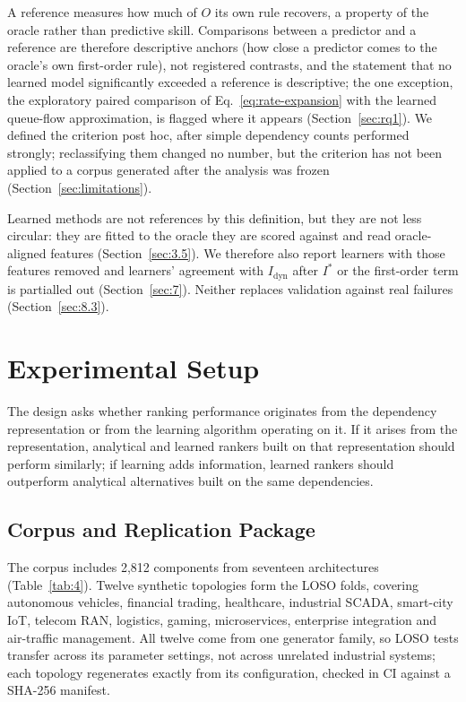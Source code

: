 \documentclass[preprint,3p]{elsarticle}
\begin{document}
A reference measures how much of $O$ its own rule recovers, a property of the oracle rather than predictive skill. Comparisons between a predictor and a reference are therefore descriptive anchors (how close a predictor comes to the oracle's own first-order rule), not registered contrasts, and the statement that no learned model significantly exceeded a reference is descriptive; the one exception, the exploratory paired comparison of Eq.~\eqref{eq:rate-expansion} with the learned queue-flow approximation, is flagged where it appears (Section~\ref{sec:rq1}). We defined the criterion post hoc, after simple dependency counts performed strongly; reclassifying them changed no number, but the criterion has not been applied to a corpus generated after the analysis was frozen (Section~\ref{sec:limitations}).

Learned methods are not references by this definition, but they are not less circular: they are fitted to the oracle they are scored against and read oracle-aligned features (Section~\ref{sec:3.5}). We therefore also report learners with those features removed and learners' agreement with $I_{\text{dyn}}$ after $I^*$ or the first-order term is partialled out (Section~\ref{sec:7}). Neither replaces validation against real failures (Section~\ref{sec:8.3}).

\section{Experimental Setup}
\label{sec:6}

The design asks whether ranking performance originates from the dependency representation or from the learning algorithm operating on it. If it arises from the representation, analytical and learned rankers built on that representation should perform similarly; if learning adds information, learned rankers should outperform analytical alternatives built on the same dependencies.

\subsection{Corpus and Replication Package}
\label{sec:6.1}

The corpus includes 2,812 components from seventeen architectures (Table~\ref{tab:4}). Twelve synthetic topologies form the LOSO folds, covering autonomous vehicles, financial trading, healthcare, industrial SCADA, smart-city IoT, telecom RAN, logistics, gaming, microservices, enterprise integration and air-traffic management. All twelve come from one generator family, so LOSO tests transfer across its parameter settings, not across unrelated industrial systems; each topology regenerates exactly from its configuration, checked in CI against a SHA-256 manifest.
\end{document}
